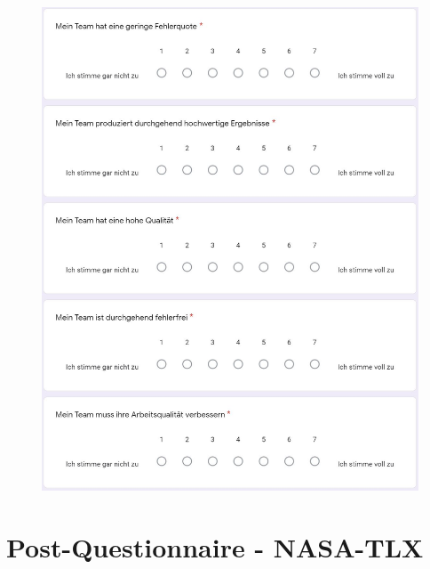 \documentclass[a4paper,11pt]{article}%
\renewcommand{\\}{\vspace*{0.5\baselineskip} \newline}
\begin{document}
	\begin{figure}[H]
		\begin{footnotesize}
			\includegraphics[width=\textwidth]{Abbildungen/Fragebogen/Post-Questionnaire/PQTE1}
		\end{footnotesize}
	\end{figure}	

\newpage
\section{Post-Questionnaire - NASA-TLX}
\label{Post-Questionnaire - NASA-TLX}
\end{document}
